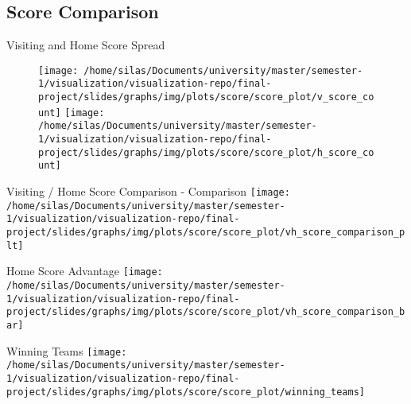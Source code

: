 \documentclass[pdf]{beamer}
\begin{document}
    \subsection{Score Comparison}
    \begin{frame}{Visiting and Home Score Spread}
        \begin{figure}
            \texttt{[image: /home/silas/Documents/university/master/semester-1/visualization/visualization-repo/final-project/slides/graphs/img/plots/score/score\_plot/v\_score\_count]}
            \hfill
            \texttt{[image: /home/silas/Documents/university/master/semester-1/visualization/visualization-repo/final-project/slides/graphs/img/plots/score/score\_plot/h\_score\_count]}
        \end{figure}
    \end{frame}
    \begin{frame}{Visiting / Home Score Comparison - Comparison}
        \centering
        \texttt{[image: /home/silas/Documents/university/master/semester-1/visualization/visualization-repo/final-project/slides/graphs/img/plots/score/score\_plot/vh\_score\_comparison\_plt]}
    \end{frame}
    \begin{frame}{Home Score Advantage}
        \centering
        \texttt{[image: /home/silas/Documents/university/master/semester-1/visualization/visualization-repo/final-project/slides/graphs/img/plots/score/score\_plot/vh\_score\_comparison\_bar]}
    \end{frame}
    \begin{frame}{Winning Teams}
        \centering
        \texttt{[image: /home/silas/Documents/university/master/semester-1/visualization/visualization-repo/final-project/slides/graphs/img/plots/score/score\_plot/winning\_teams]}
    \end{frame}
\end{document}
